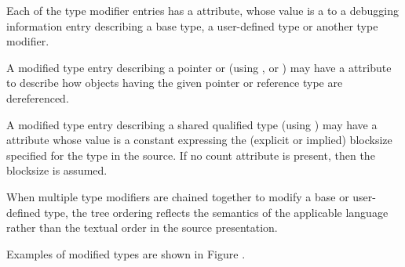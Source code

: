 Each of the type modifier entries has a
\DWATtype{} attribute,
whose value is a 
to a debugging information entry
describing a base type, a user-defined type or another type
modifier.

A modified type entry describing a
pointer or 
(using \DWTAGpointertype,
\DWTAGreferencetype{} or
\DWTAGrvaluereferencetype)
may have
a\hypertarget{chap:DWATadressclasspointerorreferencetypes}{}
\DWATaddressclassDEFN{}
attribute to describe how objects having the given pointer
or reference type are dereferenced.

A modified type entry describing a  shared qualified type
(using \DWTAGsharedtype) may have a
\DWATcount{} attribute
whose value is a constant expressing the (explicit or implied) blocksize specified for the
type in the source. If no count attribute is present, then the 
blocksize is assumed.

When multiple type modifiers are chained together to modify
a base or user-defined type, the tree ordering reflects the
semantics of the
applicable language
rather
than
the
textual
order
in
the
source
presentation.

Examples of modified types are shown in Figure .

